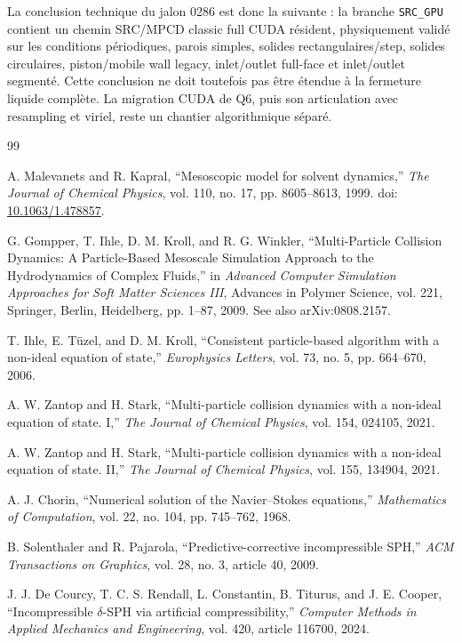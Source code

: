 \documentclass[11pt,a4paper]{article}
\begin{document}
La conclusion technique du jalon 0286 est donc la suivante : la branche \texttt{SRC\_GPU} contient un chemin SRC/MPCD classic full CUDA résident, physiquement validé sur les conditions périodiques, parois simples, solides rectangulaires/step, solides circulaires, piston/mobile wall legacy, inlet/outlet full-face et inlet/outlet segmenté. Cette conclusion ne doit toutefois pas être étendue à la fermeture liquide complète. La migration CUDA de Q6, puis son articulation avec resampling et viriel, reste un chantier algorithmique séparé.

\begin{thebibliography}{99}

A. Malevanets and R. Kapral,
``Mesoscopic model for solvent dynamics,''
\emph{The Journal of Chemical Physics}, vol. 110, no. 17, pp. 8605--8613, 1999.
doi: \href{https://doi.org/10.1063/1.478857}{10.1063/1.478857}.

G. Gompper, T. Ihle, D. M. Kroll, and R. G. Winkler,
``Multi-Particle Collision Dynamics: A Particle-Based Mesoscale Simulation Approach to the Hydrodynamics of Complex Fluids,''
in \emph{Advanced Computer Simulation Approaches for Soft Matter Sciences III},
Advances in Polymer Science, vol. 221, Springer, Berlin, Heidelberg, pp. 1--87, 2009.
See also arXiv:0808.2157.

T. Ihle, E. Tüzel, and D. M. Kroll,
``Consistent particle-based algorithm with a non-ideal equation of state,''
\emph{Europhysics Letters}, vol. 73, no. 5, pp. 664--670, 2006.

A. W. Zantop and H. Stark,
``Multi-particle collision dynamics with a non-ideal equation of state. I,''
\emph{The Journal of Chemical Physics}, vol. 154, 024105, 2021.

A. W. Zantop and H. Stark,
``Multi-particle collision dynamics with a non-ideal equation of state. II,''
\emph{The Journal of Chemical Physics}, vol. 155, 134904, 2021.

A. J. Chorin,
``Numerical solution of the Navier--Stokes equations,''
\emph{Mathematics of Computation}, vol. 22, no. 104, pp. 745--762, 1968.

B. Solenthaler and R. Pajarola,
``Predictive-corrective incompressible SPH,''
\emph{ACM Transactions on Graphics}, vol. 28, no. 3, article 40, 2009.

J. J. De Courcy, T. C. S. Rendall, L. Constantin, B. Titurus, and J. E. Cooper,
``Incompressible $\delta$-SPH via artificial compressibility,''
\emph{Computer Methods in Applied Mechanics and Engineering}, vol. 420, article 116700, 2024.


\end{thebibliography}
\end{document}
